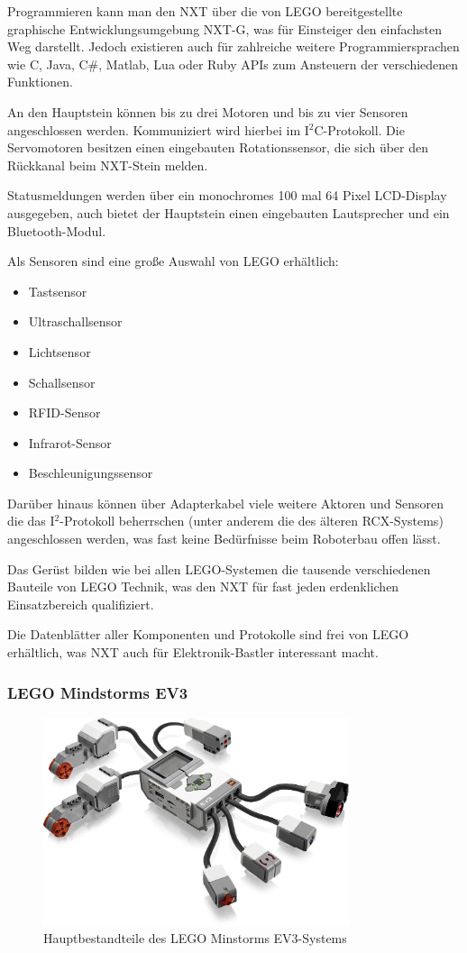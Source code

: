 Programmieren kann man den NXT über die von LEGO bereitgestellte graphische Entwicklungsumgebung NXT-G, was für Einsteiger den einfachsten Weg darstellt. Jedoch existieren auch für zahlreiche weitere Programmiersprachen wie C, Java, C\#, Matlab, Lua oder Ruby APIs zum Ansteuern der verschiedenen Funktionen.

An den Hauptstein können bis zu drei Motoren und bis zu vier Sensoren angeschlossen werden. Kommuniziert wird hierbei im I$^2$C-Protokoll. Die Servomotoren besitzen einen eingebauten Rotationssensor, die sich über den Rückkanal beim NXT-Stein melden.

Statusmeldungen werden über ein monochromes 100 mal 64 Pixel LCD-Display ausgegeben, auch bietet der Hauptstein einen eingebauten Lautsprecher und ein Bluetooth-Modul.

Als Sensoren sind eine große Auswahl von LEGO erhältlich:
\begin{itemize}
\item Tastsensor
\item Ultraschallsensor
\item Lichtsensor
\item Schallsensor
\item RFID-Sensor
\item Infrarot-Sensor
\item Beschleunigungssensor
\end{itemize}

Darüber hinaus können über Adapterkabel viele weitere Aktoren und Sensoren die das I$^2$-Protokoll beherrschen (unter anderem die des älteren RCX-Systems) angeschlossen werden, was fast keine Bedürfnisse beim Roboterbau offen lässt.

Das Gerüst bilden wie bei allen LEGO-Systemen die tausende verschiedenen Bauteile von LEGO Technik, was den NXT für fast jeden erdenklichen Einsatzbereich qualifiziert.

Die Datenblätter aller Komponenten und Protokolle sind frei von LEGO erhältlich, was NXT auch für Elektronik-Bastler interessant macht.

\subsubsection{LEGO Mindstorms EV3}

\begin{figure}[h]
\centering
\includegraphics[width=0.8\textwidth]{Bilder/MatsAndMets/ev3}
\caption{Hauptbestandteile des LEGO Minstorms EV3-Systems}
\label{fig:ev3}
\end{figure}

